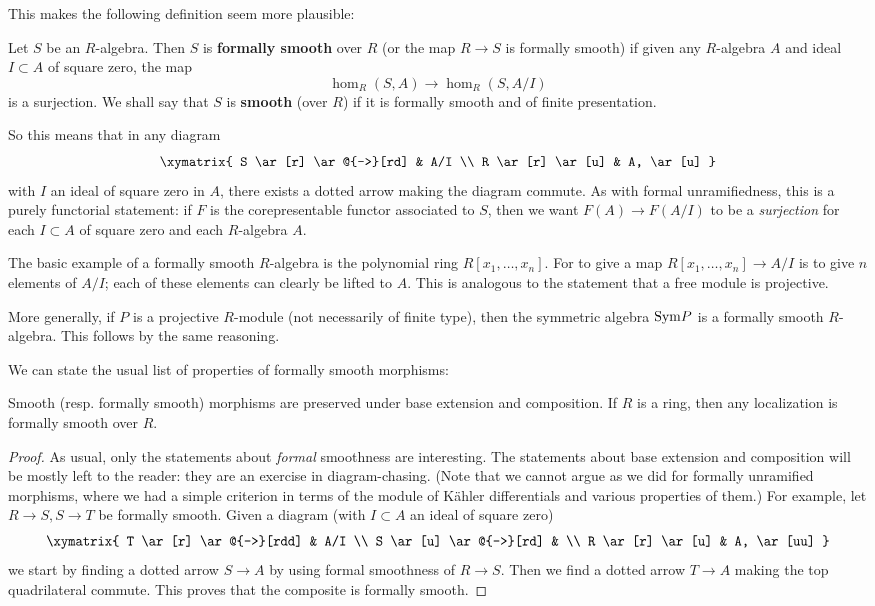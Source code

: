 This makes the following definition seem more plausible:

\begin{definition} 
Let $S$ be an $R$-algebra. Then $S$ is \textbf{formally smooth} over $R$ (or
the map $R \to S$ is formally smooth) if given any
$R$-algebra $A$ and ideal $I \subset A $ of square zero, the map
\[ \hom_R(S, A) \to \hom_R(S, A/I)\]
is a surjection.
We shall say that $S$ is \textbf{smooth} (over $R$) if it is formally smooth and of finite
presentation.
\end{definition} 

So this means that in any diagram 
$$
\xymatrix{
S \ar[r] \ar@{-->}[rd] & A/I \\
R \ar[r] \ar[u] & A, \ar[u]
}
$$
with $I$ an ideal of square zero in $A$, there exists a dotted arrow making the diagram commute.
As with formal unramifiedness, this is a purely functorial statement: if $F$ is
the corepresentable functor associated to $S$, then we want $F(A) \to F(A/I)$
to be a \emph{surjection} for each $I \subset A$ of square zero and each
$R$-algebra $A$.


\begin{example}
The basic example of a formally smooth $R$-algebra is the polynomial ring
$R[x_1, \dots, x_n]$. For to give a map $R[x_1, \dots, x_n] \to A/I$ is to give
$n$ elements of $A/I$; each of these elements can clearly be lifted to $A$.
This is analogous to the statement that a free module is projective.

More generally, if $P$ is a projective $R$-module (not necessarily of finite
type), then the symmetric algebra $\mathrm{Sym} P$ is a formally smooth $R$-algebra.
This follows by the same reasoning. 
\end{example}

We can state the usual list of properties of formally smooth morphisms:

\begin{proposition}
\label{smoothsorite}
Smooth (resp. formally smooth) morphisms are preserved under base extension and
composition.
If $R$ is a ring, then any localization  is formally smooth over $R$.
\end{proposition} 
\begin{proof}  As usual, only the statements about \emph{formal} smoothness are
interesting.
The statements about base extension and composition will be mostly left to the reader:
they are an exercise in diagram-chasing. (Note that we cannot argue as we did
for formally unramified morphisms, where we had a simple criterion in terms of
the module of K\"ahler differentials and various properties of them.) 
For example, let $R \to S, S \to T$ be formally smooth. 
Given a diagram (with $I \subset A$ an ideal of square zero)
\[ \xymatrix{
T \ar[r]  \ar@{-->}[rdd]  & A/I \\
S  \ar[u] \ar@{-->}[rd] & \\
R \ar[r] \ar[u] & A, \ar[uu]
}\]
we start by finding a dotted arrow $S \to A$ by using formal smoothness of $R
\to S$. Then we find a dotted arrow $T \to A$ making the top quadrilateral
commute. This proves that the composite is formally smooth. 
\end{proof} 
